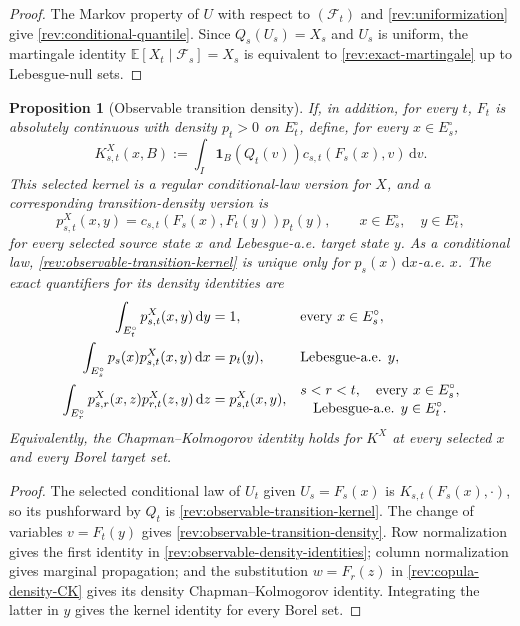 \documentclass[11pt]{article}
\newtheorem{proposition}[definition]{Proposition}
\theoremstyle{remark}
\newcommand{\E}{\mathbb E}
\newcommand{\dd}{\,\mathrm d}
\newcommand{\one}{\mathbf 1}
\begin{document}
\begin{proof}
The Markov property of $U$ with respect to $(\mathcal F_t)$ and
\eqref{rev:uniformization} give \eqref{rev:conditional-quantile}.  Since
$Q_s(U_s)=X_s$ and $U_s$ is uniform, the martingale identity
$\E[X_t\mid\mathcal F_s]=X_s$ is equivalent to
\eqref{rev:exact-martingale} up to Lebesgue-null sets.
\end{proof}

\begin{proposition}[Observable transition density]
\label{rev:prop-observable-density}
If, in addition, for every $t$, $F_t$ is absolutely continuous with density
$p_t>0$ on $E_t^\circ$, define, for every $x\in E_s^\circ$,
\begin{equation}
K^X_{s,t}(x,B)
:=\int_I\one_B\!\left(Q_t(v)\right)c_{s,t}\!\left(F_s(x),v\right)\dd v.
\label{rev:observable-transition-kernel}
\end{equation}
This selected kernel is a regular conditional-law version for $X$, and a
corresponding transition-density version is
\begin{equation}
p^X_{s,t}(x,y)
=c_{s,t}\!\left(F_s(x),F_t(y)\right)p_t(y),
\qquad x\in E_s^\circ,\quad y\in E_t^\circ,
\label{rev:observable-transition-density}
\end{equation}
for every selected source state $x$ and Lebesgue-a.e. target state $y$.
As a conditional law, \eqref{rev:observable-transition-kernel} is unique only
for $p_s(x)\dd x$-a.e. $x$.  The exact quantifiers for its density identities
are
\begin{align}
\int_{E_t^\circ}p^X_{s,t}(x,y)\dd y&=1,
&&\text{every }x\in E_s^\circ,\notag\\
\int_{E_s^\circ}p_s(x)p^X_{s,t}(x,y)\dd x&=p_t(y),
&&\text{Lebesgue-a.e. }y,\notag\\
\int_{E_r^\circ}p^X_{s,r}(x,z)p^X_{r,t}(z,y)\dd z
&=p^X_{s,t}(x,y),
&&\begin{gathered}
s<r<t,\quad\text{every }x\in E_s^\circ,\\[-2pt]
\text{Lebesgue-a.e. }y\in E_t^\circ.
\end{gathered}
\label{rev:observable-density-identities}
\end{align}
Equivalently, the Chapman--Kolmogorov identity holds for
$K^X$ at every selected $x$ and every Borel target set.
\end{proposition}

\begin{proof}
The selected conditional law of $U_t$ given $U_s=F_s(x)$ is
$K_{s,t}(F_s(x),\cdot)$, so its pushforward by $Q_t$ is
\eqref{rev:observable-transition-kernel}.  The change of variables
$v=F_t(y)$ gives \eqref{rev:observable-transition-density}.  Row normalization
gives the first identity in \eqref{rev:observable-density-identities}; column
normalization gives marginal propagation; and the substitution $w=F_r(z)$ in
\eqref{rev:copula-density-CK} gives its density Chapman--Kolmogorov identity.
Integrating the latter in $y$ gives the kernel identity for every Borel set.
\end{proof}
\end{document}
